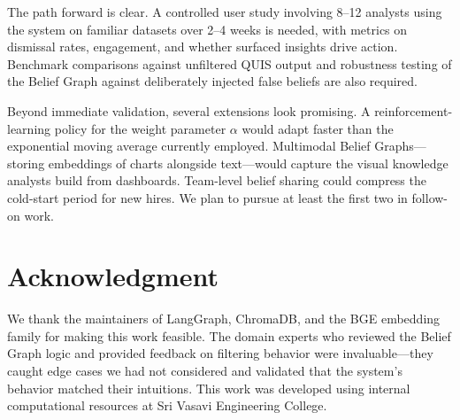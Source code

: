 \documentclass[conference]{IEEEtran}
\begin{document}
The path forward is clear. A controlled user study involving 8--12
analysts using the system on familiar datasets over 2--4 weeks is
needed, with metrics on dismissal rates, engagement, and whether
surfaced insights drive action. Benchmark comparisons against
unfiltered QUIS output and robustness testing of the Belief Graph
against deliberately injected false beliefs are also required.

Beyond immediate validation, several extensions look promising.
A reinforcement-learning policy for the weight parameter $\alpha$
would adapt faster than the exponential moving average currently
employed. Multimodal Belief Graphs---storing embeddings of charts
alongside text---would capture the visual knowledge analysts build
from dashboards. Team-level belief sharing could compress the
cold-start period for new hires. We plan to pursue at least the
first two in follow-on work.

\section*{Acknowledgment}

We thank the maintainers of LangGraph, ChromaDB, and the BGE embedding
family for making this work feasible. The domain experts who reviewed
the Belief Graph logic and provided feedback on filtering behavior were
invaluable---they caught edge cases we had not considered and validated
that the system's behavior matched their intuitions. This work was
developed using internal computational resources at Sri Vasavi
Engineering College.
\end{document}
